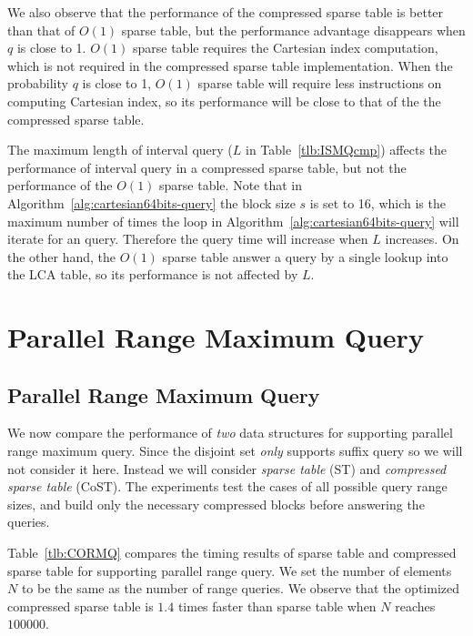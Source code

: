 We also observe that the performance of the compressed sparse table is
better than that of $O(1)$ sparse table, but the performance advantage
disappears when $q$ is close to 1. $O(1)$ sparse table requires the
Cartesian index computation, which is not required in the compressed
sparse table implementation.  When the probability $q$ is close to 1,
$O(1)$ sparse table will require less instructions on computing
Cartesian index, so its performance will be close to that of the the
compressed sparse table.

The maximum length of interval query ($L$ in Table~\ref{tlb:ISMQcmp})
affects the performance of interval query in a compressed sparse
table, but not the performance of the $O(1)$ sparse table.  Note that
in Algorithm~\ref{alg:cartesian64bits-query} the block size $s$ is set
to 16, which is the maximum number of times the loop in
Algorithm~\ref{alg:cartesian64bits-query} will iterate for an query.
Therefore the query time will increase when $L$ increases.  On the
other hand, the $O(1)$ sparse table answer a query by a single lookup
into the LCA table, so its performance is not affected by $L$.


\ifdefined\MasterThesis
\section{Parallel Range Maximum Query}
\else
\subsection{Parallel Range Maximum Query}
\fi

We now compare the performance of {\em two} data structures for
supporting parallel range maximum query.  Since the disjoint set {\em
  only} supports suffix query so we will not consider it here.
Instead we will consider {\em sparse table} ({\sc ST}) and {\em
  compressed sparse table} ({\sc CoST}).  The experiments test the
cases of all possible query range sizes, and build only the necessary
compressed blocks before answering the queries.

Table~\ref{tlb:CORMQ} compares the timing results of sparse table and
compressed sparse table for supporting parallel range query.  We set
the number of elements $N$ to be the same as the number of range
queries.  We observe that the optimized compressed sparse table is
$1.4$ times faster than sparse table when $N$ reaches $100000$.

